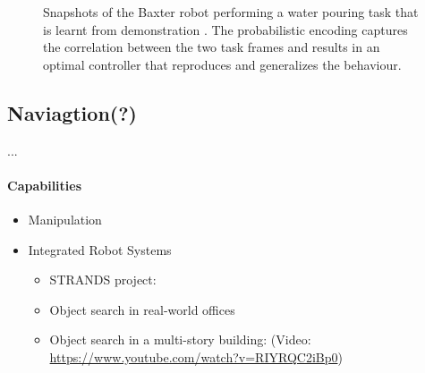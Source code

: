 \documentclass[runningheads,a4paper]{llncs}
\begin{document}
\begin{figure}[!tbh]
	\centering
	\caption{Snapshots of the Baxter robot performing a water pouring task that
	is learnt from demonstration \cite{Zeestraten2017-RAL}. The probabilistic
	encoding captures the correlation between the two task frames and results
	in an optimal controller that reproduces and generalizes the behaviour.}
	\label{fig:baxter_water_task}
\end{figure}

\subsection{Naviagtion(?)}
...

\paragraph{Capabilities}
\begin{itemize}

    \item Manipulation
    \item Integrated Robot Systems
        \begin{itemize}
            \item STRANDS project: \cite{strands@ram}
            \item Object search in real-world offices \cite{kunze14indirect}
            \item Object search in a multi-story building: \cite{kunze12objsearch} (Video: \url{https://www.youtube.com/watch?v=RIYRQC2iBp0})

        \end{itemize}
\end{itemize}
\end{document}
